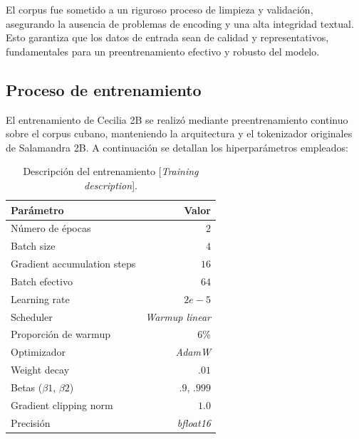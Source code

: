 \documentclass[10pt,twoside]{rcmart} %
\begin{document}
El corpus fue sometido a un riguroso proceso de limpieza y validación, asegurando la ausencia de problemas de encoding y una alta integridad textual. Esto garantiza que los datos de entrada sean de calidad y representativos, fundamentales para un preentrenamiento efectivo y robusto del modelo.

\subsection{Proceso de entrenamiento}

El entrenamiento de Cecilia 2B se realizó mediante preentrenamiento continuo sobre el corpus cubano, manteniendo la arquitectura y el tokenizador originales de Salamandra 2B. A continuación se detallan los hiperparámetros empleados:

\begin{table}[hbt]
\caption{Descripción del entrenamiento [\textit{Training description}].}
\begin{center}
\begin{tabular}{lr}\hline\hline
Parámetro 					& Valor                  \\\hline\hline
Número de épocas            & $2$					 \\
Batch size                  & $4$					 \\
Gradient accumulation steps & $16$    				 \\
Batch efectivo              & $64$    				 \\
Learning rate               & $2e-5$				 \\
Scheduler                   & \textit{Warmup linear} \\
Proporción de warmup        & $6$\%					 \\
Optimizador                 & \textit{AdamW}		 \\
Weight decay                & $.01$					 \\
Betas ($\beta 1$, $\beta 2$)& $.9$, $.999$			 \\
Gradient clipping norm      & $1.0$					 \\
Precisión                   & \textit{bfloat16}      \\\hline\hline
\end{tabular}
\end{center}
\label{tab:desc-training}
\end{table}
\end{document}
